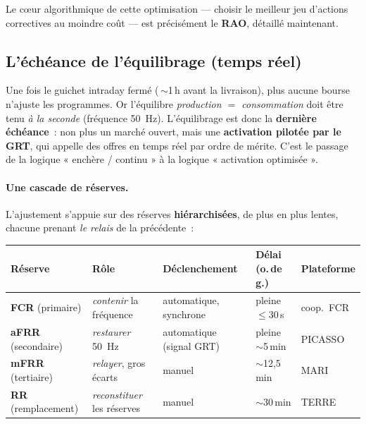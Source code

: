 \documentclass[11pt,a4paper]{article}
\begin{document}
Le c\oe{}ur algorithmique de cette optimisation — choisir le meilleur jeu
d'actions correctives au moindre coût — est précisément le \textbf{RAO},
détaillé maintenant.

\subsection{L'échéance de l'équilibrage (temps réel)}
\label{sec:balancing}

Une fois le guichet intraday fermé (\,$\sim$1\,h avant la livraison), plus
aucune bourse n'ajuste les programmes. Or l'équilibre
\emph{production $=$ consommation} doit être tenu \emph{à la seconde}
(fréquence 50~Hz). L'équilibrage est donc la \textbf{dernière échéance}~: non
plus un marché ouvert, mais une \textbf{activation pilotée par le GRT}, qui
appelle des offres en temps réel par ordre de mérite. C'est le passage de la
logique « enchère / continu » à la logique « activation optimisée ».

\paragraph{Une cascade de réserves.} L'ajustement s'appuie sur des réserves
\textbf{hiérarchisées}, de plus en plus lentes, chacune prenant \emph{le
relais} de la précédente~:

\begin{center}\footnotesize
\renewcommand{\arraystretch}{1.3}
\begin{tabular}{@{}p{2.2cm}p{2.9cm}p{2.7cm}p{2.3cm}p{1.7cm}@{}}
\toprule
\textbf{Réserve} & \textbf{Rôle} & \textbf{Déclenchement} & \textbf{Délai (o.\,de g.)} & \textbf{Plateforme} \\
\midrule
\textbf{FCR} \newline (primaire)     & \emph{contenir} la fréquence          & automatique, synchrone      & pleine $\le$30\,s      & coop.\ FCR \\
\textbf{aFRR} \newline (secondaire)  & \emph{restaurer} 50~Hz                & automatique (signal GRT)    & pleine $\sim$5\,min    & PICASSO \\
\textbf{mFRR} \newline (tertiaire)   & \emph{relayer}, gros écarts           & manuel                      & $\sim$12,5\,min        & MARI \\
\textbf{RR} \newline (remplacement)  & \emph{reconstituer} les réserves      & manuel                      & $\sim$30\,min          & TERRE \\
\bottomrule
\end{tabular}
\end{center}
\end{document}

